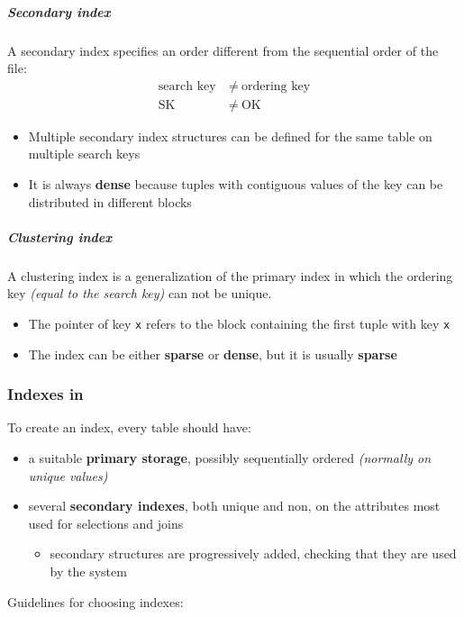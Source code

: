 \documentclass[english]{article}
\begin{document}
\subparagraph*{Secondary index}
A secondary index specifies an order different from the sequential order of the file:
\begin{align*}
  \text{search key} \  & \neq \ \text{ordering key} \\
  \text{SK} \          & \neq \ \text{OK}
\end{align*}

\begin{itemize}
  \item Multiple secondary index structures can be defined for the same table on multiple search keys
  \item It is always \textbf{dense} because tuples with contiguous values of the key can be distributed in different blocks
\end{itemize}

\subparagraph*{Clustering index}
A clustering index is a generalization of the primary index in which the ordering key \textit{(equal to the search key)} can not be unique.

\begin{itemize}
  \item The pointer of key \texttt{x} refers to the block containing the first tuple with key \texttt{x}
  \item The index can be either \textbf{sparse} or \textbf{dense}, but it is usually \textbf{sparse}
\end{itemize}

\subsubsection{Indexes in \sql}

To create an \sql index, every table should have:

\begin{itemize}
  \item a suitable \textbf{primary storage}, possibly sequentially ordered \textit{(normally on unique values)}
  \item several \textbf{secondary indexes}, both unique and non, on the attributes most used for selections and joins
        \begin{itemize}
          \item secondary structures are progressively added, checking that they are used by the system
        \end{itemize}
\end{itemize}

Guidelines for choosing indexes:
\end{document}
